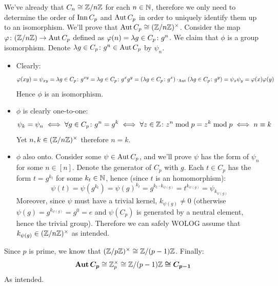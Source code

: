 \documentclass[a4paper]{article}
\begin{document}
\begin{enumerate}
\begin{enumerate}
			We've already that $C_n \cong \mathbb{Z}/n\mathbb{Z}$ for each $n \in \mathbb{N}$, therefore we only need to determine the order of $\operatorname{Inn} C_p$ and $\operatorname{Aut} C_p$ in order to uniquely identify them up to an isomorphism. We'll prove that $\operatorname{Aut} C_p \cong (\mathbb{Z}/n\mathbb{Z})^{\times}$. Consider the map $\varphi \colon (\mathbb{Z}/n\mathbb{Z}) \to \operatorname{Aut} C_p$ defined as $\varphi(n) = \lambda g \in C_p\colon g^{n}$. We claim that $\phi$ is a group isomorphism. Denote $\lambda g \in C_p\colon g^{n} \in \operatorname{Aut} C_p$ by $\psi_n$. 
			\begin{itemize}
				\item Clearly: 
				\[ \varphi(xy) = \psi_{xy} = \lambda g \in C_p \colon g^{xy} = \lambda g \in C_p\colon g^{x}g^{y} = (\lambda g \in C_p\colon g^{x}) \cdot_{\operatorname{Aut}}(\lambda g \in C_p \colon g^{y}) = \psi_x \psi_y = \varphi(x)\varphi(y) \]
				Hence $\phi$ is an isomorphism. 
				\item $\phi$ is clearly one-to-one: 
				\[ \psi_k = \psi_n \iff \forall g \in C_p \colon g^{n} = g^{k} \iff \forall z \in \mathbb{Z} \colon z^{n}\bmod p = z^{k}\bmod p \iff n \equiv k \]
				Yet $n, k \in (\mathbb{Z}/n\mathbb{Z})^{\times}$ therefore $n = k$. 
				\item $\phi$ also onto. Consider some $\psi \in \operatorname{Aut} C_p$, and we'll prove $\psi$ has the form of $\psi_n$ for some $n \in [n]$. Denote the generator of $C_p$ with $g$. Each $t \in C_p$ has the form $t = g^{k_t}$ for some $k_t \in \mathbb{N}$, hence (since $t$ is an homomorphism): 
				\[ \psi(t) = \psi(g^{k_t}) = \psi(g)^{k_t} = g^{k_t \cdot k_{\psi(g)}} = t^{k_{\psi(g)}} = \psi_{k_{\psi(g)}} \]
				Moreover, since $\psi$ must have a trivial kernel, $k_{\psi(g)} \neq 0$ (otherwise $\psi(g) = g^{k_{\psi(g)}} = g^{0} = e$ and $\psi(C_p)$ is generated by a neutral element, hence the trivial group). Therefore we can safely WOLOG assume that $k_{\psi(g)} \in (\mathbb{Z}/n\mathbb{Z})^{\times}$ as intended. 
			\end{itemize}
			Since $p$ is prime, we know that $(\mathbb{Z}/p\mathbb{Z})^{\times} \cong \mathbb{Z}/(p - 1)\mathbb{Z}$. Finally: 
			\[ \bm{\Aut C_p} \cong \Z_p^{\times} \cong \Z/(p - 1)\Z \bm{\cong C_{p - 1}} \]
			As intended. 
			

\end{enumerate}
\end{enumerate}
\end{document}
